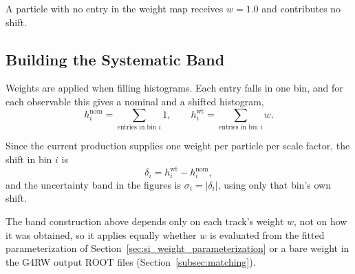\documentclass[%
article,
nofootinbib
]{revtex4-2}
\begin{document}
A particle with no entry in the weight map receives $w = 1.0$ and contributes no shift. 

\subsection{\label{subsec:application}Building the Systematic Band}

Weights are applied when filling histograms. Each entry falls in one bin, and
for each observable this gives a nominal and a shifted histogram,
\begin{equation}
\label{eq:hist_pair}
h^{\text{nom}}_i = \sum_{\text{entries in bin } i} 1,
\qquad
h^{\text{wt}}_i = \sum_{\text{entries in bin } i} w .
\end{equation}


Since the current production supplies one weight per particle per scale factor,
the shift in bin $i$ is
\begin{equation}
\label{eq:unisim_shift}
\delta_i = h^{\text{wt}}_i - h^{\text{nom}}_i ,
\end{equation}
and the uncertainty band in the figures is $\sigma_i = |\delta_i|$, using
only that bin's own shift. 

The band construction above depends only on each track's weight $w$, not on how it was obtained, so it applies equally whether $w$ is evaluated from the fitted parameterization of Section~\ref{sec:si_weight_parameterization} or a bare weight in the G4RW output ROOT files (Section~\ref{subsec:matching}).




\end{document}
